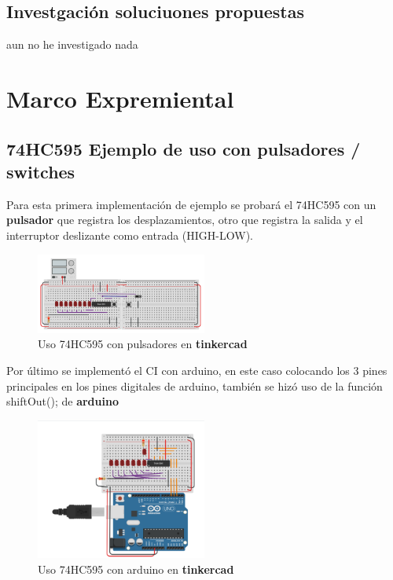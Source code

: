 \documentclass{article}
\begin{document}
\subsection{Investgación soluciuones propuestas}
aun no he investigado nada


\section{Marco Expremiental} \label{practica}
\subsection*{74HC595 Ejemplo de uso con pulsadores / switches}
Para esta primera implementación de ejemplo se probará el 74HC595 con un \textbf{pulsador} \cite{74hc595_pulsador} que registra los desplazamientos, otro que registra la salida y el interruptor deslizante como entrada (HIGH-LOW).

\begin{figure}[h!]
\caption{Uso 74HC595 con pulsadores en \textbf{tinkercad} \cite{ejem_74HC595_pulsadores}}
\centering
\includegraphics[width=0.5\textwidth]{ejem_75hc595_pulsadores.png}
\end{figure}

Por último se implementó el CI con arduino, en este caso colocando los 3 pines principales en los pines digitales de arduino, también se hizó uso de la función shiftOut(); de \textbf{arduino} \cite{shiftOut_arduino}

\begin{figure}[h!]
\caption{Uso 74HC595 con arduino en \textbf{tinkercad} \cite{ejem_74hc595_arduino}}
\centering
\includegraphics[width=0.5\textwidth]{Ejem_74hc595_arduino.png}
\end{figure}
\end{document}
